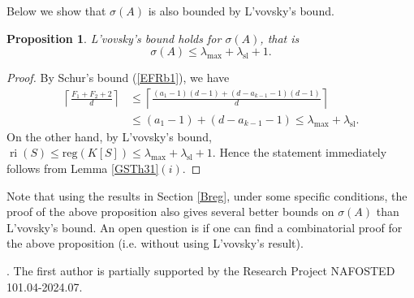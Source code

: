 \documentclass[11pt]{article}
\newtheorem{Proposition}[Theorem]{Proposition}
\def\reg{\mathrm{reg}}
\def\ri{\operatorname{ri}}
\theoremstyle{remark}
\theoremstyle{definition}
\begin{document}
 Below we show that $\sigma(A)$ is also bounded by L'vovsky's bound.
 
 \begin{Proposition} \label{SumsetLv} L'vovsky's bound holds for $\sigma(A)$, that is
 $$\sigma(A) \leq \lambda_{\max} + \lambda_{\mathrm{sl}} + 1.$$
\end{Proposition}
 
 \begin{proof} By Schur's bound (\ref{EFRb1}), we have
 \begin{align*}
     \left\lceil \frac{F_1+F_2 + 2}{d} \right\rceil&\leq \left\lceil \frac{(a_1-1) (d-1) + (d-a_{k-1}-1)(d-1)  }{d} \right\rceil \\
 &\leq  (a_1 -1) + (d-a_{k-1} -1) \leq \lambda_{\max} + \lambda_{\mathrm{sl}}.
 \end{align*}
On the other hand, by L'vovsky's bound, $\ri(S) \leq \reg(K[S]) \leq \lambda_{\max} + \lambda_{\mathrm{sl}} + 1$. Hence the statement immediately follows from Lemma \ref{GSTh31}\((i)\).
\end{proof}
Note that using the results in Section \ref{Breg}, under some specific conditions,  the proof of the above proposition also gives several better bounds on $\sigma(A)$ than L'vovsky's bound. An open question is if one can find a combinatorial proof  for the above proposition (i.e. without using L'vovsky's result).

\vskip0.5cm
.
 The first author is partially supported by the Research Project NAFOSTED 101.04-2024.07.
 
\end{document}
